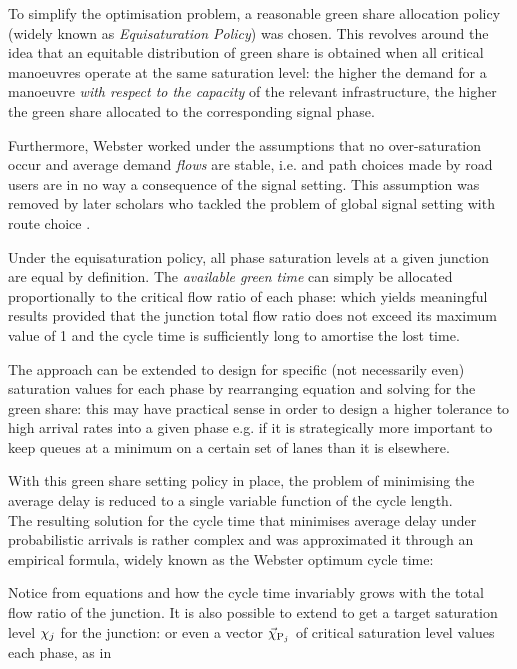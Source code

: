 To simplify the optimisation problem, a reasonable green share allocation policy (widely
known as \emph{Equisaturation Policy}) was chosen. This revolves around the idea that an equitable
distribution of green share is obtained when all critical manoeuvres operate at the same
saturation level: the higher the demand for a manoeuvre \emph{with respect to the capacity} of the
relevant infrastructure, the higher the green share allocated to the corresponding signal phase.

Furthermore, Webster worked under the assumptions that no over-saturation occur and average demand \emph{flows} are stable, i.e. and path choices made by road users are in no way a consequence of
the signal setting. This assumption was removed by later scholars who tackled the problem of global
signal setting with route choice .

Under the equisaturation policy, all phase saturation levels at a given junction are equal
by definition. The \emph{available green time} can simply be allocated proportionally to the critical
flow ratio of each phase:
which yields meaningful results provided that the junction total flow ratio does not exceed its
maximum value of 1 and the cycle time is sufficiently long to amortise the lost time.

The approach can be extended to design for specific (not necessarily even) saturation
values for each phase by rearranging equation  and solving for the green share: this may have practical sense in order to design a higher tolerance to high arrival rates
into a given phase e.g. if it is strategically more important to keep queues at a minimum on a
certain set of lanes than it is elsewhere.

With this green share setting policy in place, the problem of minimising the average delay is reduced to a single variable function of the cycle length.\\
The resulting solution for the cycle time that minimises average delay under probabilistic arrivals is rather complex and was approximated it through an empirical formula, widely known as the Webster optimum cycle time:

Notice from equations  and  how the cycle time invariably grows with the total flow ratio of the junction.
It is also possible to extend  to get a target saturation level $\chi_j$
for the junction:
or even a vector $\vec{\chi}_{\mathrm{P}_j}$ of critical saturation level values each phase, as in

